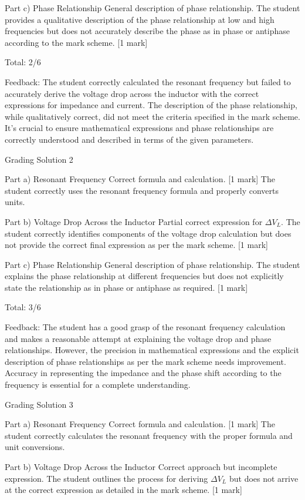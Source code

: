 \documentclass[a4paper,11pt]{article}
\begin{document}
Part c) Phase Relationship
General description of phase relationship. The student provides a qualitative description of the phase relationship at low and high frequencies but does not accurately describe the phase as in phase or antiphase according to the mark scheme. [1 mark]

Total: 2/6

Feedback: The student correctly calculated the resonant frequency but failed to accurately derive the voltage drop across the inductor with the correct expressions for impedance and current. The description of the phase relationship, while qualitatively correct, did not meet the criteria specified in the mark scheme. It's crucial to ensure mathematical expressions and phase relationships are correctly understood and described in terms of the given parameters.

Grading Solution 2

Part a) Resonant Frequency
Correct formula and calculation. [1 mark] The student correctly uses the resonant frequency formula and properly converts units.

Part b) Voltage Drop Across the Inductor
Partial correct expression for \(\Delta V_L\). The student correctly identifies components of the voltage drop calculation but does not provide the correct final expression as per the mark scheme. [1 mark]

Part c) Phase Relationship
General description of phase relationship. The student explains the phase relationship at different frequencies but does not explicitly state the relationship as in phase or antiphase as required. [1 mark]

Total: 3/6

Feedback: The student has a good grasp of the resonant frequency calculation and makes a reasonable attempt at explaining the voltage drop and phase relationships. However, the precision in mathematical expressions and the explicit description of phase relationships as per the mark scheme needs improvement. Accuracy in representing the impedance and the phase shift according to the frequency is essential for a complete understanding.

Grading Solution 3

Part a) Resonant Frequency
Correct formula and calculation. [1 mark] The student correctly calculates the resonant frequency with the proper formula and unit conversions.

Part b) Voltage Drop Across the Inductor
Correct approach but incomplete expression. The student outlines the process for deriving \(\Delta V_L\) but does not arrive at the correct expression as detailed in the mark scheme. [1 mark]
\end{document}

